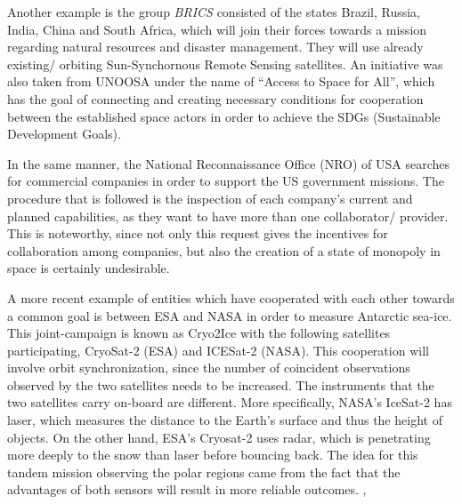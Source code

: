 Another example is the group \textit{BRICS} consisted of the states Brazil, Russia, India, China and South Africa, which will join their forces towards a mission regarding natural resources and disaster management. They will use already existing/ orbiting Sun-Synchornous Remote Sensing satellites. \cite{BRICS} An initiative was also taken from UNOOSA under the name of \hspace{1mm} “Access to Space for All”, which has the goal of connecting and creating necessary conditions for cooperation between the established space actors in order to achieve the SDGs (Sustainable Development Goals). \cite{UNOOSA}

In the same manner, the National Reconnaissance Office (NRO) of USA searches for commercial companies in order to support the US government missions. The procedure that is followed is the inspection of each company's current and planned capabilities, as they want to have more than one collaborator/ provider. This is noteworthy, since not only this request gives the incentives for collaboration among companies, but also the creation of a state of monopoly in space is certainly undesirable. \cite{NRO}

A more recent example of entities which have cooperated with each other towards a common goal is between ESA and NASA in order to measure Antarctic sea-ice. This joint-campaign is known as Cryo2Ice with the following satellites participating, CryoSat-2 (ESA) and ICESat-2 (NASA). This cooperation will involve orbit synchronization, since the number of coincident observations observed by the two satellites needs to be increased. The instruments that the two satellites carry on-board are different. More specifically, NASA's IceSat-2 has laser, which measures the distance to the Earth's surface and thus the height of objects. On the other hand, ESA's Cryosat-2 uses radar, which is penetrating more deeply to the snow than laser before bouncing back. The idea for this tandem mission observing the polar regions came from the fact that the advantages of both sensors will result in more reliable outcomes. \cite{Cryo2ice_news}, \cite{Cryo2ice}

